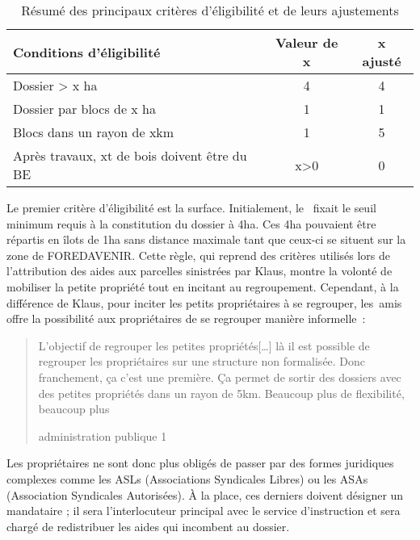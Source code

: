 \documentclass[12pt]{report}
\newcounter{table1}
\begin{document}
\begin{wraptable}{l}{0.5\textwidth}
  \centering
  \caption{Résumé des principaux critères d'éligibilité et de leurs ajustements}\label{tab:crit}
  \begin{tabulary}{\columnwidth}{|p{25mm}|c|c|}
    \hline Conditions d'éligibilité & Valeur de x & x ajusté\\
    \hline Dossier > x ha & 4&4\\
    \hline Dossier par blocs de x ha &1&1\\
    \hline Blocs dans un rayon de xkm &1&5\\
    \hline Après travaux, xt de bois doivent être du BE &x>0&0\\
    \hline 
  \end{tabulary}
\end{wraptable}

Le premier critère d'éligibilité est la surface. Initialement, le~\citet{instructionTech_ref109}
fixait le seuil minimum requis à la constitution du dossier à 4ha. Ces 4ha
pouvaient être répartis en îlots de 1ha sans distance maximale tant que ceux-ci
se situent sur la zone de FOREDAVENIR. Cette règle, qui reprend des critères
utilisés lors de l'attribution des aides aux parcelles sinistrées par Klaus,
montre la volonté de mobiliser la petite propriété tout en incitant au
regroupement. Cependant, à la différence de Klaus, pour inciter les petits
propriétaires à se regrouper, les~\glspl{ami} offre la possibilité aux
propriétaires de se regrouper manière informelle~:
\blockquote[administration publique 1]{L’objectif de regrouper les petites propriétés[…]
  là il est possible de regrouper les propriétaires sur une structure non
  formalisée. Donc franchement, ça c’est une première. Ça permet de sortir des
  dossiers avec des petites propriétés dans un rayon de 5km. Beaucoup plus de
  flexibilité, beaucoup plus}
Les propriétaires ne sont donc plus obligés de passer par des formes juridiques
complexes comme les ASLs (Associations Syndicales Libres) ou les ASAs (Association
Syndicales Autorisées). À la place, ces derniers doivent désigner un
mandataire ; il sera l'interlocuteur principal avec le service d'instruction et
sera chargé de redistribuer les aides qui incombent au dossier.
\end{document}
